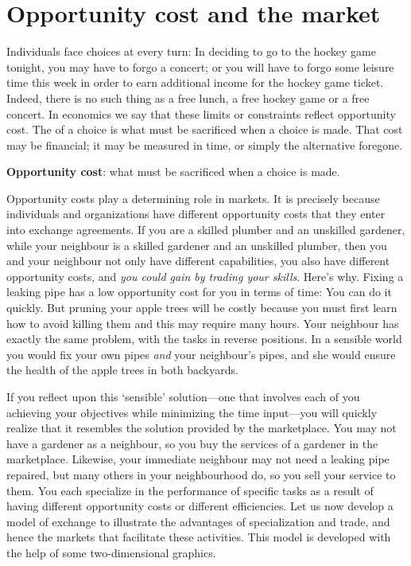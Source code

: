 \section{Opportunity cost and the market}\label{sec:ch1sec3}

Individuals face choices at every turn: In deciding to go to the hockey game
tonight, you may have to forgo a concert; or you will have to forgo some
leisure time this week in order to earn additional income for the hockey
game ticket. Indeed, there is no such thing as a free lunch, a free hockey
game or a free concert. In economics we say that these limits or constraints
reflect opportunity cost. The  of a choice is
what must be sacrificed when a choice is made. That cost may be financial;
it may be measured in time, or simply the alternative foregone.

\begin{DefBox}
	\textbf{Opportunity cost}:  what must be sacrificed when a choice is made.
\end{DefBox}

Opportunity costs play a determining role in markets. It is precisely
because individuals and organizations have different opportunity costs that
they enter into exchange agreements. If you are a skilled plumber and an
unskilled gardener, while your neighbour is a skilled gardener and an
unskilled plumber, then you and your neighbour not only have different
capabilities, you also have different opportunity costs, and \textit{you
	could gain by trading your skills}. Here's why. Fixing a leaking pipe has a
low opportunity cost for you in terms of time: You can do it quickly. But
pruning your apple trees will be costly because you must first learn how to
avoid killing them and this may require many hours. Your neighbour has
exactly the same problem, with the tasks in reverse positions. In a sensible
world you would fix your own pipes \textit{and} your neighbour's pipes, and
she would ensure the health of the apple trees in both backyards.

If you reflect upon this `sensible' solution---one that involves each of you
achieving your objectives while minimizing the time input---you will quickly
realize that it resembles the solution provided by the marketplace. You may
not have a gardener as a neighbour, so you buy the services of a gardener in
the marketplace. Likewise, your immediate neighbour may not need a leaking
pipe repaired, but many others in your neighbourhood do, so you sell your
service to them. You each specialize in the performance of specific tasks as
a result of having different opportunity costs or different efficiencies.
Let us now develop a model of exchange to illustrate the advantages of
specialization and trade, and hence the markets that facilitate these
activities. This model is developed with the help of some two-dimensional
graphics.
